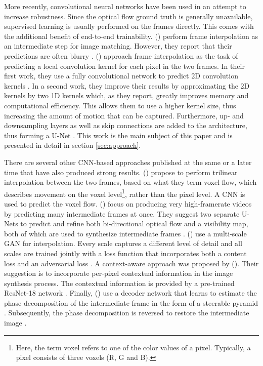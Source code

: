 \documentclass[10pt,twocolumn,letterpaper]{article}
\newcommand{\citay}[1][]{\citeauthor{#1} (\citeyear{#1})}
\begin{document}
More recently, convolutional neural networks have been used in an attempt to increase robustness.
Since the optical flow ground truth is generally unavailable, supervised learning is usually performed on the frames directly. This comes with the additional benefit of end-to-end trainability. \citay[ImageMatching] perform frame interpolation as an intermediate step for image matching. However, they report that their predictions are often blurry \cite{ImageMatching}. \citay[AdapConv] approach frame interpolation as the task of predicting a local convolution kernel for each pixel in the two frames. In their first work, they use a fully convolutional network to predict 2D convolution kernels \cite{AdapConv}. In a second work, they improve their results by approximating the 2D kernels by two 1D kernels which, as they report, greatly improves memory and computational efficiency. This allows them to use a higher kernel size, thus increasing the amount of motion that can be captured. Furthermore, up- and downsampling layers as well as skip connections are added to the architecture, thus forming a U-Net \cite{SepConv}. This work is the main subject of this paper and is presented in detail in section \ref{sec:approach}.

There are several other CNN-based approaches published at the same or a later time that have also produced strong results. \citay[DeepVoxelFlow2017] propose to perform trilinear interpolation between the two frames, based on what they term voxel flow, which describes movement on the voxel level\footnote{Here, the term voxel refers to one of the color values of a pixel. Typically, a pixel consists of three voxels (R, G and B).}, rather than the pixel level. A CNN is used to predict the voxel flow. \citay[SuperSloMo] focus on producing very high-framerate videos by predicting many intermediate frames at once. They suggest two separate U-Nets to predict and refine both bi-directional optical flow and a visibility map, both of which are used to synthesize intermediate frames \cite{SuperSloMo}. \citay[MultiScaleDeepLossAndGAN] use a multi-scale GAN for interpolation. Every scale captures a different level of detail and all scales are trained jointly with a loss function that incorporates both a content loss and an adversarial loss \cite{MultiScaleDeepLossAndGAN}. A context-aware approach was proposed by \citay[ContextAware2018]. Their suggestion is to incorporate per-pixel contextual information in the image synthesis process. The contextual information is provided by a pre-trained ResNet-18 network \cite{ResNet2016}. Finally, \citay[PhaseNet] use a decoder network that learns to estimate the phase decomposition of the intermediate frame in the form of a steerable pyramid \cite{SteerablePyramid1995}. Subsequently, the phase decomposition is reversed to restore the intermediate image \cite{PhaseNet}.
\end{document}

